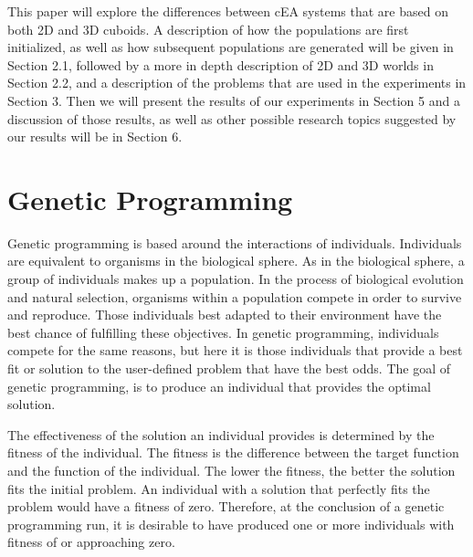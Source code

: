 \documentclass[12pt]{article}
\begin{document}
This paper will explore the differences between cEA systems that are based on both 2D and 3D cuboids. A description of how the populations are first initialized, as well as how subsequent populations are generated will be given in Section 2.1, followed by a more in depth description of 2D and 3D worlds in Section 2.2, and a description of the problems that are used in the experiments in Section 3. Then we will present the results of our experiments in Section 5 and a discussion of those results, as well as other possible research topics suggested by our results will be in Section 6.

\section{Genetic Programming} \label{Genetic Programming}

Genetic programming is based around the interactions of individuals. Individuals are equivalent to organisms in the biological sphere. As in the biological sphere, a group of individuals makes up a population. In the process of biological evolution and natural selection, organisms within a population compete in order to survive and reproduce. Those individuals best adapted to their environment have the best chance of fulfilling these objectives.  In genetic programming, individuals compete for the same reasons, but here it is those individuals that provide a best fit or solution to the user-defined problem that have the best odds. The goal of genetic programming, is to produce an individual that provides the optimal solution.

The effectiveness of the solution an individual provides is determined by the fitness of the individual. The fitness is the difference between the target function and the function of the individual. The lower the fitness, the better the solution fits the initial problem. An individual with a solution that perfectly fits the problem would have a fitness of zero. Therefore, at the conclusion of a genetic programming run, it is desirable to have produced one or more individuals with fitness of or approaching zero.
\end{document}
